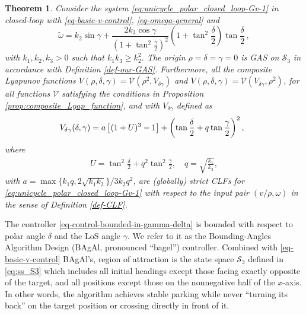 \documentclass[letterpaper, 10 pt, conference]{ieeeconf}  %
\newtheorem{theorem}{Theorem}
\newcommand{\abs}[1]{\left\lvert#1\right\rvert}
\begin{document}
\begin{theorem}
\label{thm:unicycle_CLF_Bagal}
Consider the system \eqref{eq:unicycle_polar_closed_loop-Gv-1} in closed-loop with \eqref{eq-basic-v-control}, \eqref{eq-omega-general} and 
\begin{equation}
\label{eq-control-bounded-in-gamma-delta}
\tilde\omega = k_2\sin\gamma + \displaystyle
\frac{ 2k_3 \cos\gamma }{\left(1+\displaystyle\tan^2\frac{\gamma}{2}\right)^2} \left(1+\tan^2 \frac{\delta}{2} \right)\tan \frac{\delta}{2}\,,
\end{equation}
with  $k_1, k_2, k_3 > 0$ such that 
$k_1 k_3\geq k_2^2$.
The origin $\rho = \delta = \gamma = 0$ is GAS on $\mathcal{S}_3$ in accordance with Definition \ref{def-our-GAS}.
Furthermore, all the composite Lyapunov functions $V(\rho, \delta, \gamma) = \mathcal{V}(\rho^2, V_{\delta \gamma})$ and $V(\rho, \delta, \gamma) = \mathcal{V}(V_{\delta \gamma},\rho^2)$, for all functions $\mathcal{V}$ satisfying the conditions in Proposition \ref{prop:composite_Lyap_function}, and with $V_{\delta \gamma}$ defined as
\begin{equation}
\hspace*{-0.2cm}
\label{eq:V_CLF_Bagal}
   V_{\delta \gamma}(\delta, \gamma) =    a\left[ (1+U)^3 -1\right]+ 
\left (\tan\frac{\delta}{2} + q\tan\frac{\gamma}{2}\right)^2,
\end{equation}
where
\begin{align}
U=\tan^2 \frac{\delta}{2}+ q^2 \tan^2 \frac{\gamma}{2}, \quad
q = \sqrt{ \frac{ k_1}{k_3}}, 
\end{align} 
with $a = \max\{k_1 q, 2 \sqrt{k_1k_2}\}/ 3k_2 q^2$, are (globally) strict CLFs for \eqref{eq:unicycle_polar_closed_loop-Gv-1} with respect to the input pair $(v/\rho,\omega)$ in the sense of Definition \ref{def-CLF}. 
\end{theorem}

The controller \eqref{eq-control-bounded-in-gamma-delta}
is bounded with respect to polar angle $\delta$ and the LoS angle $\gamma$. We refer to it as the Bounding-Angles Algorithm Design (BAgAl, pronounced “bagel”) controller. Combined with \eqref{eq-basic-v-control} BAgAl's, region of attraction is the state space $\mathcal{S}_3$ defined in \eqref{eq:ss_S3}
which includes all initial headings except those facing exactly opposite of the target, and all positions except those on the nonnegative half of the $x$-axis. In other words, the algorithm achieves stable parking while never “turning its back” on the target position or crossing directly in front of it.
\end{document}
